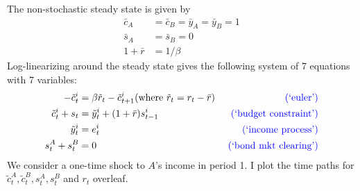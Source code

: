 \documentclass[12pt]{article}
\begin{document}
The non-stochastic steady state is given by
\begin{align*}
\bar c_A &= \bar c_B = \bar y_A = \bar y_B =1\\
\bar s_A &= \bar s_B = 0\\
1+\bar r &= 1/\beta
\end{align*}
Log-linearizing around the steady state gives the following system of 7 equations with 7 variables:
\begin{align}
-\tilde c_t^i &= \beta \tilde r_t - \tilde c^i_{t+1} (\text{where } \tilde r_t = r_t - \bar r) &\textcolor{blue}{\text{ (`euler')}} \\
\tilde c_t^i + s_t &= \tilde y^i_t + (1+\bar r) s^i_{t-1} &\textcolor{blue}{\text{ (`budget constraint')}}\\
\tilde y^i_t &= e^i_t  &\textcolor{blue}{\text{ (`income process')}}\\
s^A_t + s^B_t &=0 &\textcolor{blue}{\text{ (`bond mkt clearing')}}
\end{align}
We consider a one-time shock to $A$'s income in period 1. I plot the time paths for $\tilde c^A_t,\tilde c^B_t, s^A_t, s^B_t$ and $r_t$ overleaf.
\end{document}
